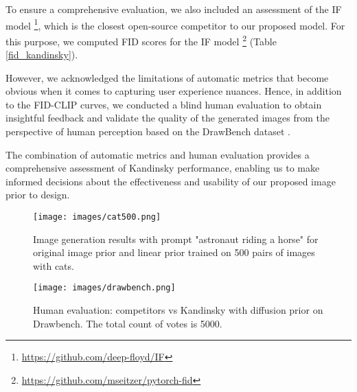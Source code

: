 \documentclass[11pt]{article}
\begin{document}
To ensure a comprehensive evaluation, we also included an assessment of the IF model \footnote{\label{IF}\url{https://github.com/deep-floyd/IF}}, which is the closest open-source competitor to our proposed model. For this purpose, we computed FID scores for the IF model \footnote{\url{https://github.com/mseitzer/pytorch-fid}} (Table \ref{fid_kandinsky}).

However, we acknowledged the limitations of automatic metrics that become obvious when it comes to capturing user experience nuances. Hence, in addition to the FID-CLIP curves, we conducted a blind human evaluation to obtain insightful feedback and validate the quality of the generated images from the perspective of human perception based on the DrawBench dataset \cite{saharia2022photorealistic}.

The combination of automatic metrics and human evaluation provides a comprehensive assessment of Kandinsky performance, enabling us to make informed decisions about the effectiveness and usability of our proposed image prior to design.
\begin{figure}
  \centering
  \texttt{[image: images/cat500.png]}
  \caption{Image generation results with prompt "astronaut riding a horse" for original image prior and linear prior trained on 500 pairs of images with cats.}
  \label{cat prior}
\end{figure}


\begin{figure*}
  \centering
  \texttt{[image: images/drawbench.png]}
  \caption{Human evaluation: competitors vs Kandinsky with diffusion prior on Drawbench. The total count of votes is 5000.}
  \label{human_eval}
\end{figure*}
\end{document}
